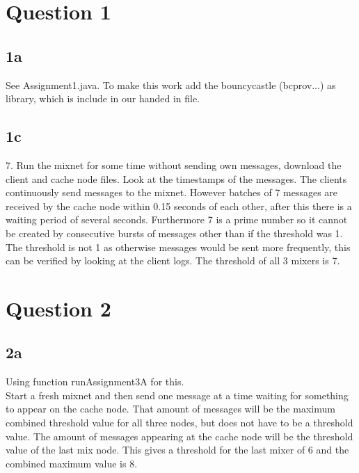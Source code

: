 \documentclass{article}
\begin{document}
\section*{Question 1}
\subsection*{1a}
 See Assignment1.java. To make this work add the bouncycastle (bcprov...) as library, which is include in our handed in file.
\subsection*{1c}
7. Run the mixnet for some time without sending own messages, download the client and cache node files. Look at the timestamps of the messages. The clients continuously send messages to the mixnet. However batches of 7 messages are received by the cache node within 0.15 seconds of each other, after this there is a waiting period of several seconds. Furthermore 7 is a prime number so it cannot be created by consecutive bursts of messages other than if the threshold was 1. The threshold is not 1 as otherwise messages would be sent more frequently, this can be verified by looking at the client logs. The threshold of all 3 mixers is 7.

\section*{Question 2}
\subsection*{2a}
Using function runAssignment3A for this. \\

Start a fresh mixnet and then send one message at a time waiting for something to appear on the cache node. That amount of messages will be the maximum combined threshold value for all three nodes, but does not have to be a threshold value. The amount of messages appearing at the cache node will be the threshold value of the last mix node.
This gives a threshold for the last mixer of 6 and the combined maximum value is 8.
\end{document}
